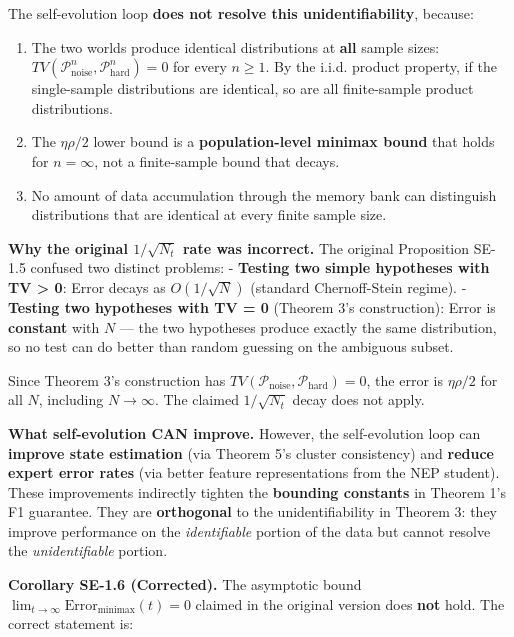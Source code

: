 \documentclass[
  12pt,
]{article}
\providecommand{\tightlist}{%
  \setlength{\itemsep}{0pt}\setlength{\parskip}{0pt}}
\begin{document}
The self-evolution loop \textbf{does not resolve this
unidentifiability}, because:

\begin{enumerate}
\def\labelenumi{\arabic{enumi}.}
\tightlist
\item
  The two worlds produce identical distributions at \textbf{all} sample
  sizes:
  \(TV(\mathcal{P}_{\text{noise}}^n, \mathcal{P}_{\text{hard}}^n) = 0\)
  for every \(n \geq 1\). By the i.i.d. product property, if the
  single-sample distributions are identical, so are all finite-sample
  product distributions.
\item
  The \(\eta\rho/2\) lower bound is a \textbf{population-level minimax
  bound} that holds for \(n = \infty\), not a finite-sample bound that
  decays.
\item
  No amount of data accumulation through the memory bank can distinguish
  distributions that are identical at every finite sample size.
\end{enumerate}

\textbf{Why the original \(1/\sqrt{N_t}\) rate was incorrect.} The
original Proposition SE-1.5 confused two distinct problems: -
\textbf{Testing two simple hypotheses with TV \textgreater{} 0}: Error
decays as \(O(1/\sqrt{N})\) (standard Chernoff-Stein regime). -
\textbf{Testing two hypotheses with TV = 0} (Theorem 3's construction):
Error is \textbf{constant} with \(N\) --- the two hypotheses produce
exactly the same distribution, so no test can do better than random
guessing on the ambiguous subset.

Since Theorem 3's construction has
\(TV(\mathcal{P}_{\text{noise}}, \mathcal{P}_{\text{hard}}) = 0\), the
error is \(\eta\rho/2\) for all \(N\), including \(N \to \infty\). The
claimed \(1/\sqrt{N_t}\) decay does not apply.

\textbf{What self-evolution CAN improve.} However, the self-evolution
loop can \textbf{improve state estimation} (via Theorem 5's cluster
consistency) and \textbf{reduce expert error rates} (via better feature
representations from the NEP student). These improvements indirectly
tighten the \textbf{bounding constants} in Theorem 1's F1 guarantee.
They are \textbf{orthogonal} to the unidentifiability in Theorem 3: they
improve performance on the \emph{identifiable} portion of the data but
cannot resolve the \emph{unidentifiable} portion.

\textbf{Corollary SE-1.6 (Corrected).} The asymptotic bound
\(\lim_{t\to\infty} \text{Error}_{\text{minimax}}(t) = 0\) claimed in
the original version does \textbf{not} hold. The correct statement is:
\end{document}

